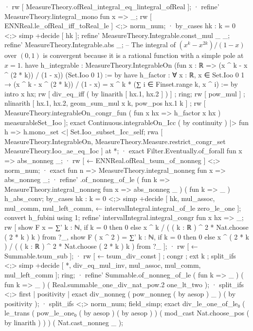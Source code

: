         · rw [ MeasureTheory.ofReal_integral_eq_lintegral_ofReal ];
          · refine' MeasureTheory.lintegral_mono fun x => _;
            rw [ ENNReal.le_ofReal_iff_toReal_le ] <;> norm_num;
          · by_cases hk : k = 0 <;> simp +decide [ hk ];
            refine' MeasureTheory.Integrable.const_mul _ _;
            refine' MeasureTheory.Integrable.abs _;
            -- The integral of $(x^k - x^{2k}) / (1 - x)$ over $(0, 1)$ is convergent because it is a rational function with a simple pole at $x = 1$.
            have h_integrable : MeasureTheory.IntegrableOn (fun x : ℝ => (x ^ k - x ^ (2 * k)) / (1 - x)) (Set.Ioo 0 1) := by
              have h_factor : ∀ x : ℝ, x ∈ Set.Ioo 0 1 → (x ^ k - x ^ (2 * k)) / (1 - x) = x ^ k * (∑ i ∈ Finset.range k, x ^ i) := by
                intro x hx; rw [ div_eq_iff ( by linarith [ hx.1, hx.2 ] ) ] ; ring;
                rw [ pow_mul ] ; nlinarith [ hx.1, hx.2, geom_sum_mul x k, pow_pos hx.1 k ] ;
              rw [ MeasureTheory.integrableOn_congr_fun ( fun x hx => h_factor x hx ) measurableSet_Ioo ];
              exact Continuous.integrableOn_Icc ( by continuity ) |> fun h => h.mono_set <| Set.Ioo_subset_Icc_self;
            rwa [ MeasureTheory.IntegrableOn, MeasureTheory.Measure.restrict_congr_set MeasureTheory.Ioo_ae_eq_Ioc ] at *;
          · exact Filter.Eventually.of_forall fun x => abs_nonneg _;
        · rw [ ← ENNReal.ofReal_tsum_of_nonneg ] <;> norm_num;
          · exact fun n => MeasureTheory.integral_nonneg fun x => abs_nonneg _;
          · refine' .of_nonneg_of_le ( fun k => MeasureTheory.integral_nonneg fun x => abs_nonneg _ ) ( fun k => _ ) h_abs_conv;
            by_cases hk : k = 0 <;> simp +decide [ hk, mul_assoc, mul_comm, mul_left_comm, ← intervalIntegral.integral_of_le zero_le_one ];
    convert h_fubini using 1;
    refine' intervalIntegral.integral_congr fun x hx => _;
    rw [ show F x = ∑' k : ℕ, if k = 0 then 0 else x ^ k / ( ( k : ℝ ) ^ 2 * Nat.choose ( 2 * k ) k ) from ?_, show F ( x ^ 2 ) = ∑' k : ℕ, if k = 0 then 0 else x ^ ( 2 * k ) / ( ( k : ℝ ) ^ 2 * Nat.choose ( 2 * k ) k ) from ?_ ];
    · rw [ ← Summable.tsum_sub ];
      · rw [ ← tsum_div_const ] ; congr ; ext k ; split_ifs <;> simp +decide [ *, div_eq_mul_inv, mul_assoc, mul_comm, mul_left_comm ];
        ring;
      · refine' Summable.of_nonneg_of_le ( fun k => _ ) ( fun k => _ ) ( Real.summable_one_div_nat_pow.2 one_lt_two );
        · split_ifs <;> first | positivity | exact div_nonneg ( pow_nonneg ( by aesop ) _ ) ( by positivity );
        · split_ifs <;> norm_num;
          field_simp;
          exact div_le_one_of_le₀ ( le_trans ( pow_le_one₀ ( by aesop ) ( by aesop ) ) ( mod_cast Nat.choose_pos ( by linarith ) ) ) ( Nat.cast_nonneg _ );
